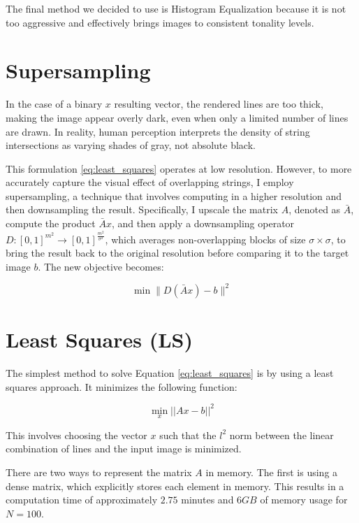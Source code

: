 The final method we decided to use is Histogram Equalization because it is not too aggressive and effectively brings images to consistent tonality levels.

\section{Supersampling} \label{sec:supersampling}

In the case of a binary \(x\) resulting vector, the rendered lines are too thick, making the image appear overly dark, even when only a limited number of lines are drawn. In reality, human perception interprets the density of string intersections as varying shades of gray, not absolute black.

This formulation \ref{eq:least_squares} operates at low resolution. However, to more accurately capture the visual effect of overlapping strings, I employ supersampling, a technique that involves computing in a higher resolution and then downsampling the result. Specifically, I upscale the matrix \(A\), denoted as \(\bar{A}\), compute the product \(\bar{A}x\), and then apply a downsampling operator \(D : \left[ 0, 1\right] ^ {m^2} \rightarrow \left[ 0, 1\right] ^ \frac{m^2}{\sigma^2}\), which averages non-overlapping blocks of size \(\sigma \times \sigma\), to bring the result back to the original resolution before comparing it to the target image \(b\). The new objective becomes:

\begin{equation}
\label{eq:supersampling}
\min{\| D(\bar{A} x) - b \|^2}
\end{equation}

\section{Least Squares (LS)}

The simplest method to solve Equation \ref{eq:least_squares} is by using a least squares approach. It minimizes the following function:

\begin{equation}
\min_{x}{||Ax - b||^2}
\end{equation}

This involves choosing the vector \(x\) such that the \(l^2\) norm between the linear combination of lines and the input image is minimized.

There are two ways to represent the matrix \(A\) in memory. The first is using a dense matrix, which explicitly stores each element in memory. This results in a computation time of approximately \(2.75\) minutes and \(6GB\) of memory usage for \(N=100\). 

